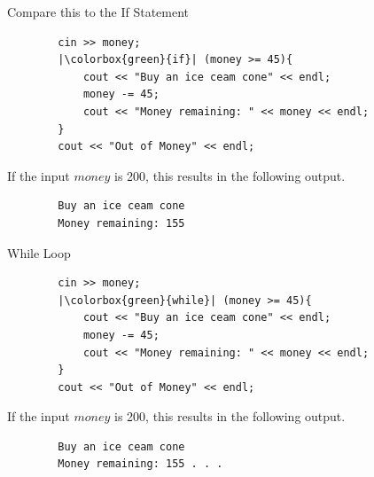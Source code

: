 \begin{frame}[fragile]{Compare this to the If Statement}{}
    \begin{verbatim}
        cin >> money;
        |\colorbox{green}{if}| (money >= 45){
            cout << "Buy an ice ceam cone" << endl;
            money -= 45;
            cout << "Money remaining: " << money << endl;
        }
        cout << "Out of Money" << endl;
    \end{verbatim}
    \begin{block}{If the input $money$ is 200, this results in the following output.}
        \begin{verbatim}
        Buy an ice ceam cone
        Money remaining: 155
        \end{verbatim}
    \end{block}
\end{frame}

\begin{frame}[fragile]{While Loop}{}
    \begin{verbatim}
        cin >> money;
        |\colorbox{green}{while}| (money >= 45){
            cout << "Buy an ice ceam cone" << endl;
            money -= 45;
            cout << "Money remaining: " << money << endl;
        }
        cout << "Out of Money" << endl;
    \end{verbatim}
    \begin{block}{If the input $money$ is 200, this results in the following output.}
        \begin{verbatim}
        Buy an ice ceam cone
        Money remaining: 155 . . .
        \end{verbatim}
    \end{block}
\end{frame}



